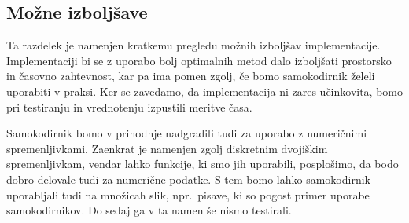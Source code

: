 \documentclass[12pt,a4paper,twoside]{article}
\theoremstyle{definition} %
\theoremstyle{plain} %
\numberwithin{equation}{section}  %
\begin{document}

\subsection{Možne izboljšave}
\label{mozne-izboljsave}


Ta razdelek je namenjen kratkemu pregledu možnih izboljšav implementacije.
Implementaciji bi se z uporabo bolj optimalnih metod dalo izboljšati prostorsko in časovno zahtevnost, kar pa ima pomen zgolj, če bomo samokodirnik želeli uporabiti v praksi.
Ker se zavedamo, da implementacija ni zares učinkovita, bomo pri testiranju in vrednotenju izpustili meritve časa.

Samokodirnik bomo v prihodnje nadgradili tudi za uporabo z numeričnimi spremenljivkami.
Zaenkrat je namenjen zgolj diskretnim dvojiškim spremenljivkam, vendar lahko funkcije, ki smo jih uporabili, posplošimo, da bodo dobro delovale tudi za numerične podatke.
S tem bomo lahko samokodirnik uporabljali tudi na množicah slik, npr.\ pisave, ki so pogost primer uporabe samokodirnikov.
Do sedaj ga v ta namen še nismo testirali.


\end{document}
